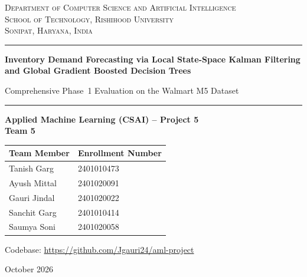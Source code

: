 \documentclass[11pt,a4paper]{article}
\begin{document}
\begin{titlepage}
\thispagestyle{empty}
\centering
\vspace*{0.5cm}
{\large\scshape Department of Computer Science and Artificial Intelligence\\
School of Technology, Rishihood University\\
Sonipat, Haryana, India\par}
\vspace{0.6cm}
{\color{navy}\rule{\textwidth}{1.2pt}}\par
\vspace{1.0cm}
{\Huge\bfseries\color{navy} Inventory Demand Forecasting via Local State-Space Kalman Filtering and Global Gradient Boosted Decision Trees\par}
\vspace{0.5cm}
{\Large Comprehensive Phase~1 Evaluation on the Walmart M5 Dataset\par}
\vspace{1.0cm}
{\color{navy}\rule{\textwidth}{1.2pt}}\par
\vspace{1.2cm}
{\large\bfseries Applied Machine Learning (CSAI) -- Project 5\\[2pt] Team 5\par}
\vspace{0.9cm}

\renewcommand{\arraystretch}{1.5}
\begin{tabular}{@{}l l@{}}
\toprule
\textbf{Team Member} & \textbf{Enrollment Number}\\
\midrule
Tanish Garg   & 2401010473\\
Ayush Mittal  & 2401020091\\
Gauri Jindal  & 2401020022\\
Sanchit Garg  & 2401010414\\
Saumya Soni   & 2401020058\\
\bottomrule
\end{tabular}

\vspace{1.2cm}
{\normalsize Codebase: \url{https://github.com/Jgauri24/aml-project}\par}
\vspace{0.3cm}
{\normalsize October 2026\par}
\vfill
\end{titlepage}
\end{document}
